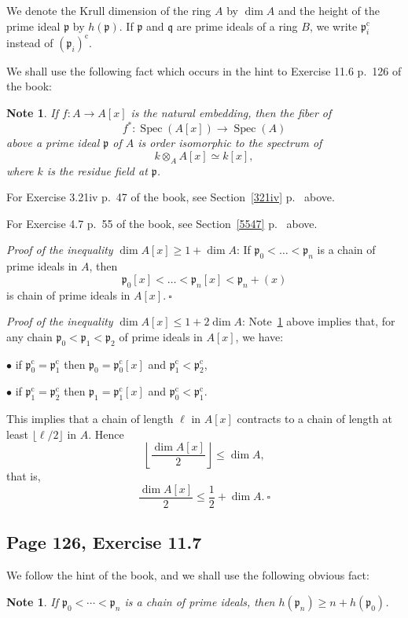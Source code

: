 \documentclass[parskip=half,fontsize=12pt]{scrartcl}%
\newcommand{\oo}{\operatorname}\newcommand{\ooo}{\operatorname*}
\newcommand{\mf}{\mathfrak}
\newcommand{\ppp}{\mf p}
\newtheorem{note}[thm]{Note}
\begin{document}
We denote the Krull dimension of the ring $A$ by $\dim A$ and the height of the prime ideal $\ppp$ by $h(\ppp)$. If $\ppp$ and $\mf q$ are prime ideals of a ring $B$, we write %
$\ppp_i^{\oo c}$ instead of $(\ppp_i)^{\oo c}$. %

We shall use the following fact which occurs in the hint to Exercise 11.6 p.~126 of the book:

\begin{note}\label{116b}
If $f:A\to A[x]$ is the natural embedding, then the fiber of 
$$
f^*:\oo{Spec}(A[x])\to\oo{Spec}(A)
$$ 
above a prime ideal $\ppp$ of $A$ is order isomorphic to the spectrum of
$$
k\otimes_AA[x]\simeq k[x],
$$ 
where $k$ is the residue field at $\ppp$.
\end{note}

For Exercise 3.21iv p.~47 of the book, see Section~\ref{321iv} p.~\pageref{321iv} above. 

For Exercise 4.7 p.~55 of the book, see Section~\ref{5547} p.~\pageref{5547} above. 

\emph{Proof of the inequality} $\dim A[x]\ge1+\dim A$: If 
$
\ppp_0<\dots<\ppp_n
$ 
is a chain of prime ideals in $A$, then 
$$
\ppp_0[x]<\dots<\ppp_n[x]<\ppp_n+(x)
$$ 
is chain of prime ideals in $A[x].\ \square$

\emph{Proof of the inequality} $\dim A[x]\le1+2\dim A$: Note~\ref{116b} above implies that, for any chain $\ppp_0<\ppp_1<\ppp_2$ of prime ideals in $A[x]$, we have:

$\bullet$ if $\ppp_0^{\oo c}=\ppp_1^{\oo c}$ then $\ppp_0=\ppp_0^{\oo c}[x]$ and $\ppp_1^{\oo c}<\ppp_2^{\oo c}$,

$\bullet$ if $\ppp_1^{\oo c}=\ppp_2^{\oo c}$ then $\ppp_1=\ppp_1^{\oo c}[x]$ and $\ppp_0^{\oo c}<\ppp_1^{\oo c}$.

This implies that a chain of length $\ell$ in $A[x]$ contracts to a chain of length at least $\lfloor\ell/2\rfloor$ in $A$. Hence 
$$
\left\lfloor\frac{\dim A[x]}2\right\rfloor\le\dim A,
$$ 
that is,
$$
\frac{\dim A[x]}2\le\frac12+\dim A.\ \square
$$

\subsection{Page 126, Exercise 11.7}%

We follow the hint of the book, and we shall use the following obvious fact: 

\begin{note}\label{116a}
If $\ppp_0<\cdots<\ppp_n$ is a chain of prime ideals, then $h(\ppp_n)\ge n+h(\ppp_0)$. 
\end{note}
\end{document}
